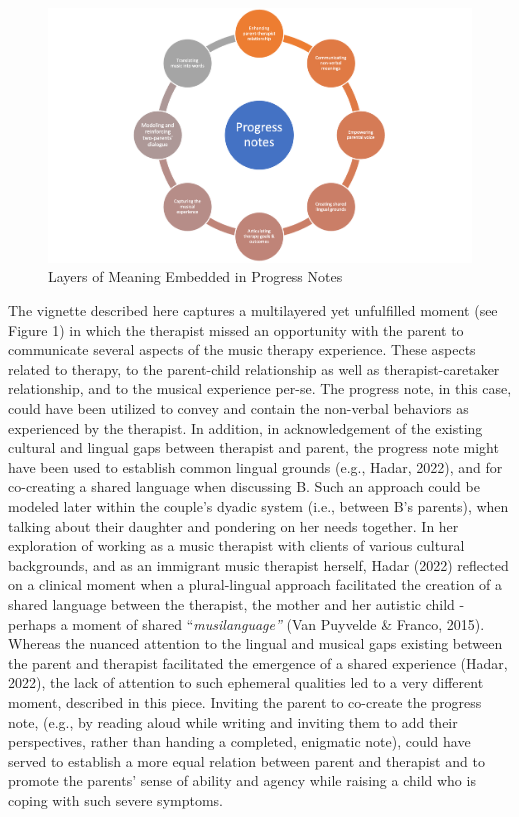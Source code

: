 \documentclass[authordate, empirical, issue]{jote-new-article}
\begin{document}
\begin{figure}[t]
  \begin{fullwidth}
    \centering
    \includegraphics[width=\textwidth]{media/Picture1.png}
    \caption{Layers of Meaning Embedded in Progress Notes}
  \end{fullwidth}
\end{figure}

The vignette described here captures a multilayered yet unfulfilled moment (see Figure 1) in which the therapist missed an opportunity with the parent to communicate several aspects of the music therapy experience. These aspects related to therapy, to the parent-child relationship as well as therapist-caretaker relationship, and to the musical experience per-se. The progress note, in this case, could have been utilized to convey and contain the non-verbal behaviors as experienced by the therapist. In addition, in acknowledgement of the existing cultural and lingual gaps between therapist and parent, the progress note might have been used to establish common lingual grounds (e.g., Hadar, 2022), and for co-creating a shared language when discussing B. Such an approach could be modeled later within the couple's dyadic system (i.e., between B's parents), when talking about their daughter and pondering on her needs together. In her exploration of working as a music therapist with clients of various cultural backgrounds, and as an immigrant music therapist herself, Hadar (2022) reflected on a clinical moment when a plural-lingual approach facilitated the creation of a shared language between the therapist, the mother and her autistic child - perhaps a moment of shared “\emph{musilanguage”} (Van Puyvelde \& Franco, 2015). Whereas the nuanced attention to the lingual and musical gaps existing between the parent and therapist facilitated the emergence of a shared experience (Hadar, 2022), the lack of attention to such ephemeral qualities led to a very different moment, described in this piece. Inviting the parent to co-create the progress note, (e.g., by reading aloud while writing and inviting them to add their perspectives, rather than handing a completed, enigmatic note), could have served to establish a more equal relation between parent and therapist and to promote the parents' sense of ability and agency while raising a child who is coping with such severe symptoms.
\end{document}
